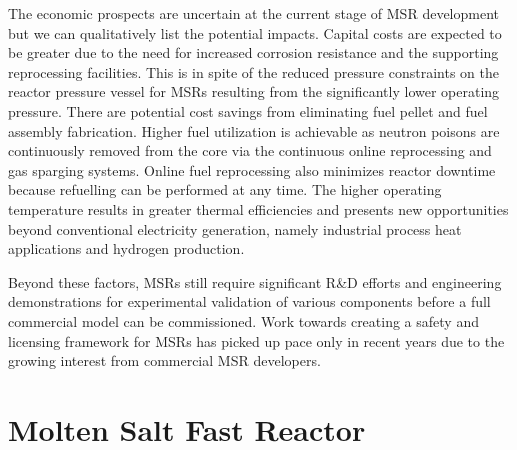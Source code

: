 The economic prospects are uncertain at the current stage of \gls{MSR}
development but we can qualitatively list the potential impacts. Capital costs
are expected to be greater due to the need for increased corrosion resistance
and the supporting reprocessing facilities. This is in spite of the reduced
pressure constraints on the reactor pressure vessel for \glspl{MSR} resulting
from the significantly lower operating pressure. There are potential cost
savings from eliminating fuel pellet and fuel assembly fabrication. Higher
fuel utilization is achievable as neutron poisons are continuously removed
from the core via the continuous online reprocessing and gas sparging systems.
Online fuel reprocessing also minimizes reactor downtime because refuelling
can be performed at any time. The higher operating temperature results in
greater thermal efficiencies and presents new opportunities beyond
conventional electricity generation, namely industrial process heat
applications and hydrogen production.

Beyond these factors, \glspl{MSR} still require significant R\&D efforts and
engineering demonstrations for experimental validation of various components
before a full commercial model can be commissioned. Work towards creating a
safety and licensing framework for \glspl{MSR} has picked up pace only in
recent years due to the growing interest from commercial \gls{MSR} developers.

\section{Molten Salt Fast Reactor}

